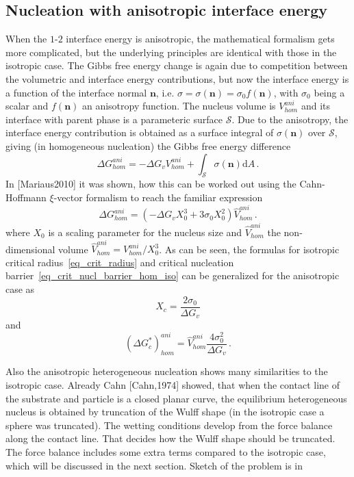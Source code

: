     \subsection{Nucleation with anisotropic interface energy}
    When the $\mathit{1}$-$\mathit{2}$ interface energy is anisotropic, the mathematical formalism gets more complicated, but the underlying principles are identical with those in the isotropic case. The Gibbs free energy change is again due to competition between the volumetric and interface energy contributions, but now the interface energy is a function of the interface normal $\bm{n}$, i.e. $\sigma=\sigma(\bm{n})=\sigma_0f(\bm{n})$, with $\sigma_0$ being a scalar and $f(\bm{n})$ an anisotropy function. The nucleus volume is $V_{hom}^{ani}$ and its interface with parent phase is a parameteric surface $\mathcal{S}$. Due to the anisotropy, the interface energy contribution is obtained as a surface integral of $\sigma(\bm{n})$ over $\mathcal{S}$, giving (in homogeneous nucleation) the Gibbs free energy difference
    \begin{equation}
        \Delta G_{hom}^{ani} = -\Delta G_v V_{hom}^{ani} + \int_{\mathcal{S}}\sigma(\bm{n}) \mathrm{d}A \,.
    \end{equation}
    In [Mariaus2010] it was shown, how this can be worked out using the Cahn-Hoffmann $\xi$-vector formalism to reach the familiar expression
    \begin{equation} \label{eq_DG_hom_aniso}
        \Delta G_{hom}^{ani} = (-\Delta G_v X_0^3 + 3\sigma_0 X_0^2)\hat{V}_{hom}^{ani} \,.
    \end{equation}
    where $X_0$ is a scaling parameter for the nucleus size and $\hat{V}_{hom}^{ani}$ the non-dimensional volume $\hat{V}_{hom}^{ani}=V_{hom}^{ani}/X_0^3$.
    As can be seen, the formulas for isotropic critical radius~\eqref{eq_crit_radius} and critical nucleation barrier~\eqref{eq_crit_nucl_barrier_hom_iso} can be generalized for the anisotropic case as
    \begin{equation}
        X_c=\frac{2\sigma_0}{\Delta G_v}
    \end{equation}
    and
    \begin{equation}
        (\Delta G^*_c)_{hom}^{ani} = \hat{V}_{hom}^{ani}\frac{4\sigma_0^2}{\Delta G_v} \,.
    \end{equation}
    
    Also the anisotropic heterogeneous nucleation shows many similarities to the isotropic case. Already Cahn [Cahn,1974] showed, that when the contact line of the substrate and particle is a closed planar curve, the equilibrium heterogeneous nucleus is obtained by truncation of the Wulff shape (in the isotropic case a sphere was truncated). The wetting conditions develop from the force balance along the contact line. That decides how the Wulff shape should be truncated. The force balance includes some extra terms compared to the isotropic case, which will be discussed in the next section. Sketch of the problem is in 
    
